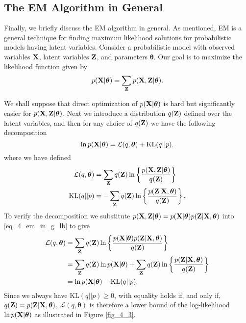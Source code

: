 \documentclass[../book-template.tex]{subfiles}
\begin{document}
\subsection{The EM Algorithm in General}\label{sec_4_EM_in_gen}
Finally, we briefly discuss the EM algorithm in general. As mentioned, EM is a general technique for finding maximum likelihood solutions for probabilistic models having latent variables. Consider a probabilistic model with observed variables ${\bf X}$, latent variables ${\bf Z}$, and parameters $\bm{\theta}$. Our goal is to maximize the likelihood function given by
\begin{equation*}
	p({\bf X}|\bm{\theta}) = \sum_{{\bf Z}} p({\bf X,Z}|\bm{\theta}).
\end{equation*} 
\par We shall suppose that direct optimization of $p({\bf X}|\bm{\theta})$ is hard but significantly easier for $p({\bf X,Z}|\bm{\theta})$. Next we introduce a distribution $q({\bf Z})$ defined over the latent variables, and then for any choice of $q({\bf Z})$ we have the following decomposition
\begin{equation*}
	\ln p({\bf X}|\bm{\theta}) = \mathcal{L}(q,\bm{\theta})+\text{KL}(q||p).
\end{equation*}
where we have defined
\begin{align}
	\label{eq_4_em_in_g_lb} \mathcal{L}(q,\bm{\theta}) &= \sum_{\bf Z}q({\bf Z})\ln \left\{\frac{p({\bf X, Z}|\bm{\theta})}{q({\bf Z})} \right\}\\
	\text{KL}(q||p)&= -\sum_{\bf Z}q({\bf Z})\ln \left\{\frac{p({\bf  Z}|{\bf X}, \bm{\theta})}{q({\bf Z})} \right\}.
\end{align}
To verify the decomposition we substitute $p({\bf X,Z}|\bm{\theta})=p({\bf X}|\bm{\theta})p({\bf Z}|{\bf X},\bm{\theta})$ into \eqref{eq_4_em_in_g_lb} to give
\begin{align}
	\mathcal{L}(q,\bm{\theta}) &= \sum_{\bf Z}q({\bf Z})\ln \left\{\frac{p({\bf X}|\bm{\theta})p({\bf Z}|{\bf X},\bm{\theta})}{q({\bf Z})} \right\} \notag\\
	&= \sum_{\bf Z}q({\bf Z})\ln p({\bf X}|\bm{\theta}) + \sum_{\bf Z}q({\bf Z})\ln \left\{\frac{p({\bf  Z}|{\bf X}, \bm{\theta})}{q({\bf Z})} \right\}\notag\\
	\label{eq_4_em_in_g_lbdcp} &= \ln p({\bf X}|\bm{\theta}) - \text{KL}(q||p).
\end{align}
Since we always have $\text{KL}(q||p)\geq 0$, with equality holds if, and only if, $q({\bf Z})=p({\bf Z}|{\bf X},\bm{\theta})$, $\mathcal{L}(q,\bm{\theta})$ is therefore a lower bound of the log-likelihood $ \ln p({\bf X}|\bm{\theta})$ as illustrated in Figure \ref{fig_4_3}.
\end{document}
